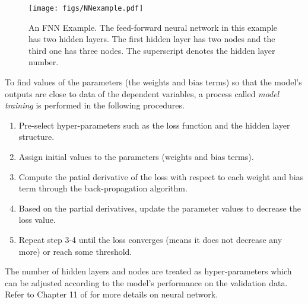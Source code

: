\documentclass[thmsa,onecolumn,12pt]{article}%
\begin{document}
\begin{figure}[!t]
	\centering
		\texttt{[image: figs/NNexample.pdf]}\\
	\caption{An FNN Example. The feed-forward neural network in this example has two hidden layers. The first hidden layer has two nodes and the third one has three nodes. The superscript denotes the hidden layer number.}
	\label{FNNexample}
\end{figure}



To find values of the parameters (the weights and bias terms) so that the model's outputs are close to data of the dependent variables, a process called \textit{model training} is performed in the following procedures.
\begin{enumerate}
\item Pre-select hyper-parameters such as the loss function and the hidden layer structure.
\item Assign initial values to the parameters (weights and bias terms).
\item Compute the patial derivative of the loss with respect to each weight and bias term through the back-propagation algorithm.
\item Based on the partial derivatives, update the parameter values to decrease the loss value.
\item Repeat step 3-4 until the loss converges (means it does not decrease any more) or reach some threshold.
\end{enumerate}
The number of hidden layers and nodes are treated as hyper-parameters which can be adjusted according to the model's performance on the validation data. Refer to Chapter 11 of \cite{Hastie2009} for more details on neural network.
\end{document}
